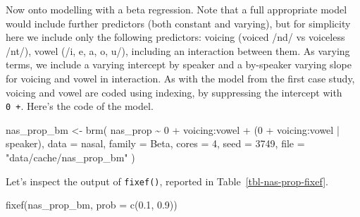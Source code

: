 \documentclass[
  authoryear,
  preprint,
  3p]{elsarticle}
\newenvironment{Shaded}{\begin{snugshade}}{\end{snugshade}}
\newcommand{\AttributeTok}[1]{\textcolor[rgb]{0.40,0.45,0.13}{#1}}
\newcommand{\DecValTok}[1]{\textcolor[rgb]{0.68,0.00,0.00}{#1}}
\newcommand{\FloatTok}[1]{\textcolor[rgb]{0.68,0.00,0.00}{#1}}
\newcommand{\FunctionTok}[1]{\textcolor[rgb]{0.28,0.35,0.67}{#1}}
\newcommand{\NormalTok}[1]{\textcolor[rgb]{0.00,0.23,0.31}{#1}}
\newcommand{\OtherTok}[1]{\textcolor[rgb]{0.00,0.23,0.31}{#1}}
\newcommand{\SpecialCharTok}[1]{\textcolor[rgb]{0.37,0.37,0.37}{#1}}
\newcommand{\StringTok}[1]{\textcolor[rgb]{0.13,0.47,0.30}{#1}}
\begin{document}
Now onto modelling with a beta regression. Note that a full appropriate
model would include further predictors (both constant and varying), but
for simplicity here we include only the following predictors: voicing
(voiced /nd/ vs voiceless /nt/), vowel (/i, e, a, o, u/), including an
interaction between them. As varying terms, we include a varying
intercept by speaker and a by-speaker varying slope for voicing and
vowel in interaction. As with the model from the first case study,
voicing and vowel are coded using indexing, by suppressing the intercept
with \texttt{0\ +}. Here's the code of the model.

\begin{Shaded}
\begin{Highlighting}[]
\NormalTok{nas\_prop\_bm }\OtherTok{\textless{}{-}} \FunctionTok{brm}\NormalTok{(}
\NormalTok{  nas\_prop }\SpecialCharTok{\textasciitilde{}} \DecValTok{0} \SpecialCharTok{+}\NormalTok{ voicing}\SpecialCharTok{:}\NormalTok{vowel }\SpecialCharTok{+}\NormalTok{ (}\DecValTok{0} \SpecialCharTok{+}\NormalTok{ voicing}\SpecialCharTok{:}\NormalTok{vowel }\SpecialCharTok{|}\NormalTok{ speaker),}
  \AttributeTok{data =}\NormalTok{ nasal,}
  \AttributeTok{family =}\NormalTok{ Beta,}
  \AttributeTok{cores =} \DecValTok{4}\NormalTok{,}
  \AttributeTok{seed =} \DecValTok{3749}\NormalTok{,}
  \AttributeTok{file =} \StringTok{"data/cache/nas\_prop\_bm"}
\NormalTok{)}
\end{Highlighting}
\end{Shaded}

Let's inspect the output of \texttt{fixef()}, reported in
Table~\ref{tbl-nas-prop-fixef}.

\begin{Shaded}
\begin{Highlighting}[]
\FunctionTok{fixef}\NormalTok{(nas\_prop\_bm, }\AttributeTok{prob =} \FunctionTok{c}\NormalTok{(}\FloatTok{0.1}\NormalTok{, }\FloatTok{0.9}\NormalTok{))}
\end{Highlighting}
\end{Shaded}
\end{document}
